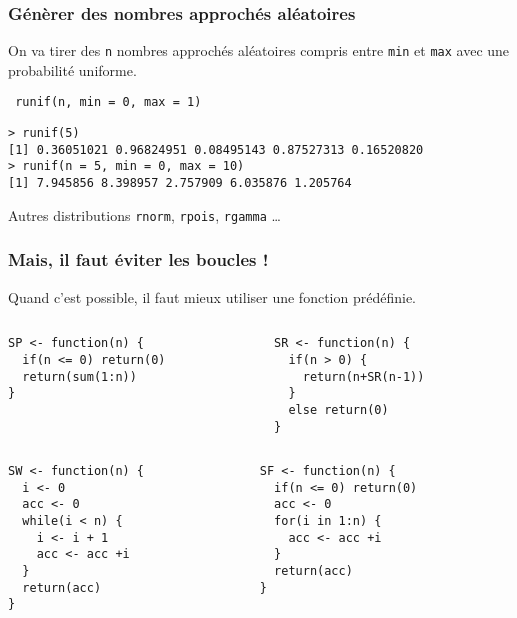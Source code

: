 \documentclass[10pt]{beamer}
\begin{document}
\begin{frame}[fragile]
  \frametitle{  Génèrer des nombres approchés aléatoires}
  On va tirer des \texttt{n} nombres approchés aléatoires compris entre \texttt{min} et \texttt{max} avec une probabilité uniforme.
  \begin{center}
    \alert{\texttt{ runif(n, min = 0, max = 1)}}
  \end{center}

    \begin{lstlisting}
> runif(5)
[1] 0.36051021 0.96824951 0.08495143 0.87527313 0.16520820
> runif(n = 5, min = 0, max = 10)
[1] 7.945856 8.398957 2.757909 6.035876 1.205764
\end{lstlisting}


\begin{block}{Autres distributions}
  \texttt{rnorm}, \texttt{rpois}, \texttt{rgamma} \dots 
\end{block}
\end{frame}


\begin{frame}[fragile]
  \frametitle{Mais, il faut éviter les boucles !}
  \begin{center}
    \alert{Quand c’est possible, il faut mieux utiliser une fonction prédéfinie.}
  \end{center}

\begin{columns}[t]
\begin{column}{0.48\textwidth}
  \begin{lstlisting}[style=editor]
SP <- function(n) {
  if(n <= 0) return(0)
  return(sum(1:n))
}    
\end{lstlisting}  
\end{column}
\begin{column}{0.48\textwidth}
  \begin{lstlisting}[style=editor]
SR <- function(n) {
  if(n > 0) {
    return(n+SR(n-1))
  }
  else return(0)
}    
  \end{lstlisting}
\end{column}
\end{columns}

\begin{columns}[t]
\begin{column}{0.48\textwidth}
  \begin{lstlisting}[style=editor]
SW <- function(n) {
  i <- 0
  acc <- 0
  while(i < n) {
    i <- i + 1
    acc <- acc +i
  }
  return(acc)
}
\end{lstlisting}
\end{column}
\begin{column}{0.48\textwidth}
  \begin{lstlisting}[style=editor]
SF <- function(n) {
  if(n <= 0) return(0)
  acc <- 0
  for(i in 1:n) {
    acc <- acc +i
  }
  return(acc)
}
\end{lstlisting}
\end{column}
\end{columns}

\end{frame}
\end{document}
